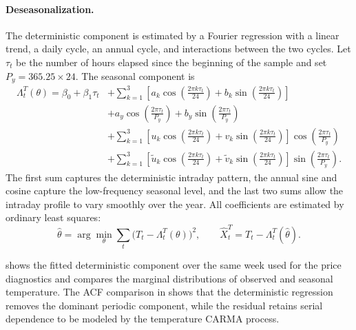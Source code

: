 \paragraph{Deseasonalization.}
The deterministic component is estimated by a Fourier regression with a linear
trend, a daily cycle, an annual cycle, and interactions between the two cycles.
Let \(\tau_t\) be the number of hours elapsed since the beginning of the sample
and set \(P_y=365.25\times24\). The seasonal component is
\begin{equation}
  \begin{aligned}
  \Lambda^T_t(\theta)
  =
  \beta_0+\beta_1\tau_t
  &+
  \sum_{k=1}^{3}
  \left[
    a_k\cos\left(\frac{2\pi k\tau_t}{24}\right)
    +
    b_k\sin\left(\frac{2\pi k\tau_t}{24}\right)
  \right] \\
  &+
  a_y\cos\left(\frac{2\pi\tau_t}{P_y}\right)
  +
  b_y\sin\left(\frac{2\pi\tau_t}{P_y}\right) \\
  &+
  \sum_{k=1}^{3}
  \left[
    u_k\cos\left(\frac{2\pi k\tau_t}{24}\right)
    +
    v_k\sin\left(\frac{2\pi k\tau_t}{24}\right)
  \right]\cos\left(\frac{2\pi\tau_t}{P_y}\right) \\
  &+
  \sum_{k=1}^{3}
  \left[
    \widetilde u_k\cos\left(\frac{2\pi k\tau_t}{24}\right)
    +
    \widetilde v_k\sin\left(\frac{2\pi k\tau_t}{24}\right)
  \right]\sin\left(\frac{2\pi\tau_t}{P_y}\right).
  \end{aligned}
  \label{eq:temperature-seasonality}
\end{equation}
The first sum captures the deterministic intraday pattern, the annual sine and
cosine capture the low-frequency seasonal level, and the last two sums allow the
intraday profile to vary smoothly over the year. All coefficients are estimated
by ordinary least squares:
\begin{equation}
  \widehat\theta
  =
  \arg\min_\theta
  \sum_t \bigl(T_t-\Lambda^T_t(\theta)\bigr)^2,
  \qquad
  \widehat X^T_t = T_t-\Lambda^T_t(\widehat\theta).
  \label{eq:temperature-ols}
\end{equation}

 shows the fitted deterministic
component over the same week used for the price diagnostics and compares the
marginal distributions of observed and seasonal temperature. The ACF comparison
in  shows that the deterministic
regression removes the dominant periodic component, while the residual retains
serial dependence to be modeled by the temperature CARMA process.

